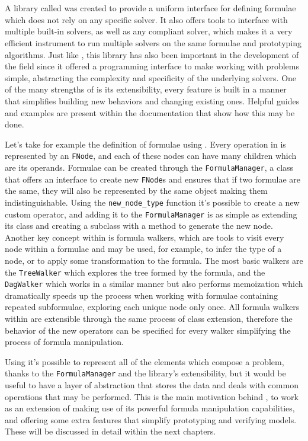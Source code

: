 \section{\pysmt{}}
A \python{} library called \pysmt{} \cite{pysmt2015} was created to provide a uniform interface for defining \smt{} formulae which does not rely on any specific solver.
It also offers tools to interface with multiple built-in solvers, as well as any \smtlib{} compliant solver, which makes it a very efficient instrument to run multiple solvers on the same formulae and prototyping algorithms.
Just like \smtlib{}, this library has also been important in the development of the field since it offered a programming interface to make working with \smt{} problems simple, abstracting the complexity and specificity of the underlying solvers.
One of the many strengths of \pysmt{} is its extensibility, every feature is built in a manner that simplifies building new behaviors and changing existing ones.
Helpful guides and examples are present within the documentation that show how this may be done.

Let's take for example the definition of formulae using \pysmt{}. Every operation in \pysmt{} is represented by an \texttt{FNode}, and each of these nodes can have many children which are its operands.
Formulae can be created through the \texttt{FormulaManager}, a class that offers an interface to create new \texttt{FNode}s and ensures that if two formulae are the same, they will also be represented by the same \python{} object making them indistinguishable.
Using the \texttt{new\_node\_type} function it's possible to create a new custom operator, and adding it to the \texttt{FormulaManager} is as simple as extending its class and creating a subclass with a method to generate the new node.
Another key concept within \pysmt{} is formula walkers, which are tools to visit every node within a formulae and may be used, for example, to infer the type of a node, or to apply some transformation to the formula.
The most basic walkers are the \texttt{TreeWalker} which explores the tree formed by the formula, and the \texttt{DagWalker} which works in a similar manner but also performs memoization which dramatically speeds up the process when working with formulae containing repeated subformulae, exploring each unique node only once.
All formula walkers within \pysmt{} are extensible through the same process of class extension, therefore the behavior of the new operators can be specified for every walker simplifying the process of formula manipulation.

Using \pysmt{} it's possible to represent all of the elements which compose a \vmt{} problem, thanks to the \texttt{FormulaManager} and the library's extensibility, but it would be useful to have a layer of abstraction that stores the data and deals with common operations that may be performed.
This is the main motivation behind \pyvmt{}, to work as an extension of \pysmt{} making use of its powerful formula manipulation capabilities, and offering some extra features that simplify prototyping and verifying models. These will be discussed in detail within the next chapters.

